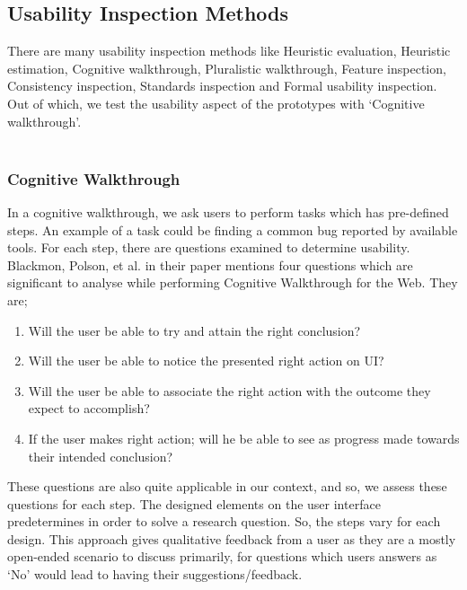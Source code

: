 \subsection{Usability Inspection Methods}

There are many usability inspection methods \cite{nielsen1994usability} like Heuristic evaluation, Heuristic estimation, Cognitive walkthrough, Pluralistic walkthrough, Feature inspection, Consistency inspection, Standards inspection and Formal usability inspection. Out of which, we test the usability aspect of the prototypes with ‘Cognitive walkthrough’. \\ \\

\subsubsection{Cognitive Walkthrough}

In a cognitive walkthrough, we ask users to perform tasks which has pre-defined steps. An example of a task could be finding a common bug reported by available tools. For each step, there are questions examined to determine usability. Blackmon, Polson, et al. in their paper \cite{blackmon2002cognitive} mentions four questions which are significant to analyse while performing Cognitive Walkthrough for the Web. They are;

\begin{enumerate}
\item Will the user be able to try and attain the right conclusion?
\item Will the user be able to notice the presented right action on UI?
\item Will the user be able to associate the right action with the outcome they expect to accomplish?
\item If the user makes right action; will he be able to see as progress made towards their intended conclusion?
\end{enumerate}

These questions are also quite applicable in our context, and so, we assess these questions for each step. The designed elements on the user interface predetermines in order to solve a research question. So, the steps vary for each design. This approach gives qualitative feedback from a user as they are a mostly open-ended scenario to discuss primarily, for questions which users answers as ‘No’ would lead to having their suggestions/feedback. \\ \\

